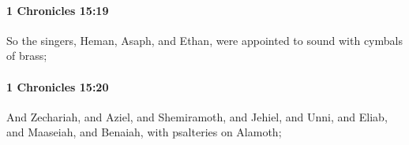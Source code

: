 		\paragraph{1 Chronicles 15:19} %
			\label{1CHRONICLES-15-19}

			So the singers, Heman, Asaph, and Ethan, were appointed to sound with cymbals of brass;


		\paragraph{1 Chronicles 15:20} %
			\label{1CHRONICLES-15-20}

			And Zechariah, and Aziel, and Shemiramoth, and Jehiel, and Unni, and Eliab, and Maaseiah, and Benaiah, with psalteries on Alamoth;


